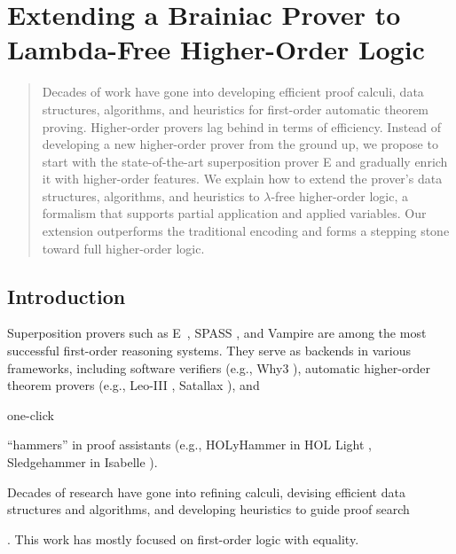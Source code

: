 \chapter{Extending a Brainiac Prover to Lambda-Free Higher-Order Logic}
\label{ch:ehoh}

\renewcommand{\confrep}[2]{#2}




\begin{abstract}
Decades of work have gone into developing efficient proof calculi, data
structures, algorithms, and heuristics for first-order automatic theorem
proving. Higher-order provers lag behind in terms of efficiency. Instead of
developing a new higher-order prover from the ground up, we propose to start
with the state-of-the-art superposition prover E and gradually enrich it with
higher-order features. We explain how to extend the prover's data structures,
algorithms, and heuristics to $\lambda$-free higher-order logic, a formalism
that supports partial application and applied variables. Our extension
outperforms the traditional encoding and forms a stepping stone
toward full higher-order logic.    
\end{abstract}

\newpage

\section{Introduction}
\label{sec:ehoh:introduction}

\begin{sloppypar}
Superposition provers such as E~\cite{scv-19-e23}, SPASS \cite{wdfksw-09-spass},
and Vampire \cite{lkav-13-vampire} are among the most successful first-order
reasoning systems. They serve as backends in various frameworks, including
software verifiers (e.g., Why3 \cite{fp-13-why3}),
%
automatic higher-order theorem provers (e.g., \hbox{Leo-III} \cite{sb-21-leo3},
Satallax \cite{cb-12-satallax}), and \begin{rep}one-click \end{rep}``hammers'' in proof assistants
(e.g., HOLyHammer in HOL Light \cite{ku-15-holyhammer}, Sledgehammer in
Isabelle \cite{pb-12-sh}).


Dec\-ades of research have gone
into refining calculi, devising efficient data structures and algorithms,
and developing heuristics to guide proof search\begin{rep}
  \cite{ss-17-arcade}\end{rep}.
This work has mostly focused on first-order logic with equality.
\end{sloppypar}

